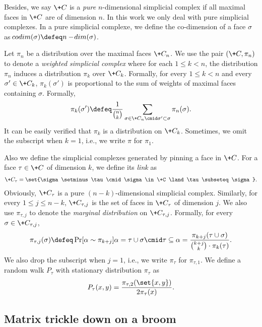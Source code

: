 \documentclass[a4paper,11pt]{article}
\begin{document}
Besides, we say $\+C$ is a \emph{pure} $n$-dimensional simplicial complex if all maximal faces in $\+C$ are of dimension $n$. In this work we only deal with pure simplicial complexes. In a pure simplicial complexe, we define the co-dimension of a face $\sigma$ as $\!{codim}(\sigma)\defeq n-\!{dim}(\sigma)$.

Let $\pi_n$ be a distribution over the maximal faces $\+C_n$. We use the pair $(\+C,\pi_n)$ to denote a \emph{weighted simplicial complex} where for each $1\le k < n$, the distribution $\pi_n$ induces a distribution $\pi_k$ over $\+C_k$. Formally, for every $1\le k<n$ and every $\sigma'\in \+C_k$, $\pi_k(\sigma')$ is proportional to the sum of weights of maximal faces containing $\sigma$. Formally,
\begin{align*}
    \pi_k(\sigma') \defeq \frac{1}{\binom n k}\sum_{\sigma\in \+C_n\cmid\sigma' \subset \sigma} \pi_{n}(\sigma).
\end{align*}
It can be easily verified that $\pi_k$ is a distribution on $\+C_k$. Sometimes, we omit the subscript when $k=1$, i.e., we write $\pi$ for $\pi_1$.

Also we define the simplicial complexes generated by pinning a face in $\+C$. For a face $\tau \in \+C$ of dimension $k$, we define its \emph{link} as
\begin{align*}
    \+C_\tau=\set{\sigma\setminus \tau \cmid \sigma \in \+C \land \tau \subseteq \sigma }.
\end{align*}
Obviously, $\+C_\tau$ is a pure $(n-k)$-dimensional simplicial complex. Similarly, for every $1\le j \le n-k$, $\+C_{\tau,j}$ is the set of faces in $\+C_\tau$ of dimension $j$. We also use $\pi_{\tau,j}$ to denote the \emph{marginal distribution} on $\+C_{\tau,j}$. Formally, for every $\sigma\in \+C_{\tau,j}$,
\begin{align*}
    \pi_{\tau,j}(\sigma)\defeq \Pr[\alpha \sim \pi_{k+j}]{\alpha=\tau \cup \sigma \cmid \tau\subseteq \alpha}=\frac{\pi_{k+j}(\tau \cup \sigma)}{\binom{k+j}{k} \cdot \pi_{k}(\tau)}.
\end{align*}
We also drop the subscript when $j=1$, i.e., we write $\pi_\tau$ for $\pi_{\tau,1}$. We define a random walk $P_\tau$ with stationary distribution $\pi_\tau$ as
\[
P_\tau(x,y)=\frac{\pi_{\tau,2}(\set{x,y})}{2\pi_\tau(x)}.
\]




\subsection{Matrix trickle down on a broom}
\end{document}
